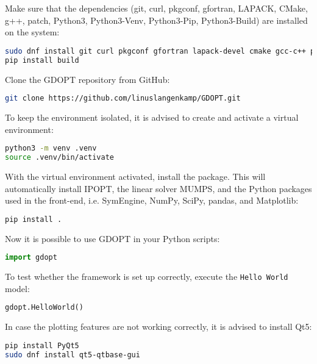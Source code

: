 \documentclass[12pt]{article}
\begin{document}
\begin{mdframed}[backgroundcolor=gray!10, roundcorner=10pt,
		linewidth=1pt]

	Make sure that the dependencies (git, curl, pkgconf, gfortran, LAPACK, CMake, g++, patch,
	Python3, Python3-Venv, Python3-Pip, Python3-Build) are installed on the system:

	\begin{lstlisting}[language=bash]
sudo dnf install git curl pkgconf gfortran lapack-devel cmake gcc-c++ python3 python3-pip python3-virtualenv patch
pip install build
	\end{lstlisting}

	Clone the GDOPT repository from GitHub:

	\begin{lstlisting}[language=bash]
git clone https://github.com/linuslangenkamp/GDOPT.git
	\end{lstlisting}

	To keep the environment isolated, it is advised to create and activate a
	virtual environment:

	\begin{lstlisting}[language=bash]
python3 -m venv .venv
source .venv/bin/activate
	\end{lstlisting}

	With the virtual environment activated, install the package. This will
	automatically install
	IPOPT\cite{wachter2006implementation}, the linear solver
	MUMPS\cite{amestoy2001fully}, and the Python packages used in the front-end,
	i.e. SymEngine\cite{symengine}, NumPy\cite{harris2020array},
	SciPy\cite{virtanen2020scipy}, pandas\cite{mckinney2010data}, and
	Matplotlib\cite{hunter2007matplotlib}:

	\begin{lstlisting}[language=bash]
pip install .
	\end{lstlisting}

	Now it is possible to use GDOPT in your Python scripts:
	\begin{lstlisting}[language=python]
import gdopt
	\end{lstlisting}

	To test whether the framework is set up correctly, execute the \texttt{Hello World} model:
	\begin{lstlisting}[language=python]
gdopt.HelloWorld()
	\end{lstlisting}

	In case the plotting features are not working correctly, it is advised to install Qt5:

	\begin{lstlisting}[language=bash]
pip install PyQt5
sudo dnf install qt5-qtbase-gui
	\end{lstlisting}

\end{mdframed}
\end{document}
